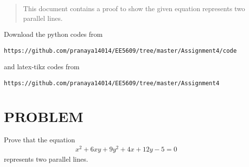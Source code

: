 \documentclass[journal,12pt,twocolumn]{IEEEtran}
\begin{document}
%
\begin{abstract}
This document contains a proof to show the given equation represents two parallel lines. 
\end{abstract}
Download the python codes from 
%
\begin{lstlisting}
https://github.com/pranaya14014/EE5609/tree/master/Assignment4/code
\end{lstlisting}
%
and latex-tikz codes from 
%
\begin{lstlisting}
https://github.com/pranaya14014/EE5609/tree/master/Assignment4
\end{lstlisting}
%
\section{PROBLEM}
Prove that the equation
\begin{align} 
    x^{2}+6xy+9y^{2}+4x+12y-5=0 \label{eq:0}
\end{align}
represents two parallel lines.
\end{document}
